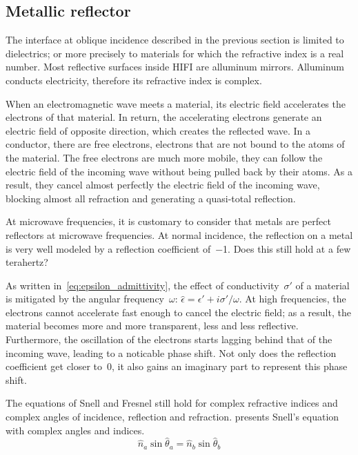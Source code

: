 \clearpage
\subsection{Metallic reflector}
\label{sec:metallic_reflector}
The interface at oblique incidence described in the previous section is limited to dielectrics; or more precisely to materials for which the refractive index is a real number.
Most reflective surfaces inside HIFI are alluminum mirrors.
Alluminum conducts electricity, therefore its refractive index is complex.

When an electromagnetic wave meets a material, its electric field accelerates the electrons of that material.
In return, the accelerating electrons generate an electric field of opposite direction, which creates the reflected wave.
In a conductor, there are free electrons, electrons that are not bound to the atoms of the material.
The free electrons are much more mobile, they can follow the electric field of the incoming wave without being pulled back by their atoms.
As a result, they cancel almost perfectly the electric field of the incoming wave, blocking almost all refraction and generating a quasi-total reflection.

At microwave frequencies, it is customary to consider that metals are perfect reflectors at microwave frequencies.
At normal incidence, the reflection on a metal is very well modeled by a reflection coefficient of~\num{-1}.
Does this still hold at a few terahertz?

As written in~\cref{eq:epsilon_admittivity}, the effect of conductivity~$\sigma'$ of a material is mitigated by the angular frequency~$\omega$:
$\hat{\epsilon} = \epsilon' + i \sigma' / \omega$.
At high frequencies, the electrons cannot accelerate fast enough to cancel the electric field;
as a result, the material becomes more and more transparent, less and less reflective.
Furthermore, the oscillation of the electrons starts lagging behind that of the incoming wave, leading to a noticable phase shift.
Not only does the reflection coefficient get closer to~0, it also gains an imaginary part to represent this phase shift.

The equations of Snell and Fresnel still hold for complex refractive indices
and complex angles of incidence, reflection and refraction.
 presents Snell's equation with complex angles and indices.
\begin{equation}
    \hat{n}_a \sin \hat{\theta}_a = \hat{n}_b \sin \hat{\theta}_b \label{eq:snell_complex}
\end{equation}


